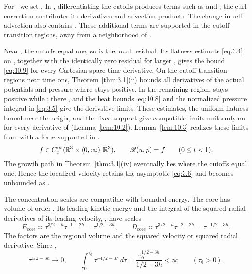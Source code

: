 For , we set . In
, differentiating the cutoffs produces
terms such as  and
; the curl correction
 contributes its derivatives
and advection products. The change in self-advection also contains
.
These additional terms are supported in the cutoff transition regions, away from a neighborhood
of .

Near , the cutoffs equal one, so
 is the local residual. Its flatness estimate \eqref{eq:3.4} on
, together with the identically zero residual for larger
, gives the bound \eqref{eq:10.9}
for every Cartesian space-time derivative. On the cutoff transition regions near time one,
Theorem~\ref{thm:3.1}\textup{(ii)} bounds all derivatives of the actual potentials and pressure where
 stays positive. In the remaining region,
 stays positive while ; there
, and the heat bounds \eqref{eq:10.8} and the normalized pressure integral in \eqref{eq:3.5} give the derivative limits.
These estimates, the uniform flatness bound near the origin, and the fixed support
 give compatible limits uniformly on
 for every derivative of  (Lemma~\ref{lem:10.2}). Lemma~\ref{lem:10.3}
realizes these limits from  with a force supported in
:
\[
f\in C_c^\infty(\mathbb{R}^3\times(0,\infty);\mathbb{R}^3),
\qquad
\mathscr R(u,p)=f
\qquad(0\leq t<1).
\]
The growth path in Theorem~\ref{thm:3.1}\textup{(iv)} eventually lies where the cutoffs equal one. Hence the
localized velocity retains the asymptotic \eqref{eq:3.6} and becomes unbounded as
.

The concentration scales are compatible with bounded energy. The core
 has volume of
order . Its leading kinetic energy
 and the integral of the squared radial derivatives
of its leading velocity, , have scales
\[
E_{\mathrm{core}}\asymp\tau^{3/2-h}\tau^{-1-2h}=\tau^{1/2-3h},
\qquad
D_{\mathrm{core}}\asymp\tau^{3/2-h}\tau^{-2-2h}=\tau^{-1/2-3h}.
\]
The factors are the regional volume and the squared velocity or squared radial derivative.
Since ,
\[
\tau^{1/2-3h}\longrightarrow0,
\qquad
\int_0^{\tau_0}\tau^{-1/2-3h}\,d\tau
=\frac{\tau_0^{1/2-3h}}{1/2-3h}<\infty
\qquad(\tau_0>0).
\]

